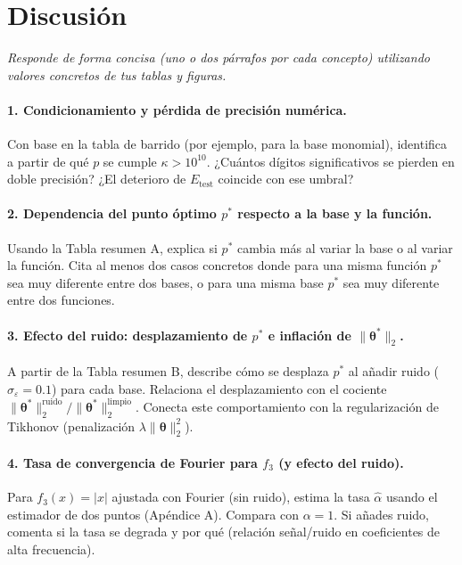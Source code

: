 \section*{Discusión}
\label{sec:discusion}

\textit{Responde de forma concisa (uno o dos párrafos por cada concepto) utilizando valores concretos de tus tablas y figuras.}

\paragraph*{1. Condicionamiento y pérdida de precisión numérica.}
Con base en la tabla de barrido (por ejemplo, para la base monomial), identifica a partir de qué \(p\) se cumple \(\kappa > 10^{10}\). ¿Cuántos dígitos significativos se pierden en doble precisión? ¿El deterioro de \(E_{\mathrm{test}}\) coincide con ese umbral?

\paragraph*{2. Dependencia del punto óptimo \(p^*\) respecto a la base y la función.}
Usando la Tabla resumen A, explica si \(p^*\) cambia más al variar la base o al variar la función. Cita al menos dos casos concretos donde para una misma función \(p^*\) sea muy diferente entre dos bases, o para una misma base \(p^*\) sea muy diferente entre dos funciones.

\paragraph*{3. Efecto del ruido: desplazamiento de \(p^*\) e inflación de \(\|\boldsymbol{\theta}^*\|_2\).}
A partir de la Tabla resumen B, describe cómo se desplaza \(p^*\) al añadir ruido (\(\sigma_\varepsilon=0.1\)) para cada base. Relaciona el desplazamiento con el cociente \(\|\boldsymbol{\theta}^*\|_2^{\text{ruido}} / \|\boldsymbol{\theta}^*\|_2^{\text{limpio}}\). Conecta este comportamiento con la regularización de Tikhonov (penalización \(\lambda\|\boldsymbol{\theta}\|_2^2\)).

\paragraph*{4. Tasa de convergencia de Fourier para \(f_3\) (y efecto del ruido).}
Para \(f_3(x)=|x|\) ajustada con Fourier (sin ruido), estima la tasa \(\hat{\alpha}\) usando el estimador de dos puntos (Apéndice A). Compara con \(\alpha=1\). Si añades ruido, comenta si la tasa se degrada y por qué (relación señal/ruido en coeficientes de alta frecuencia).

